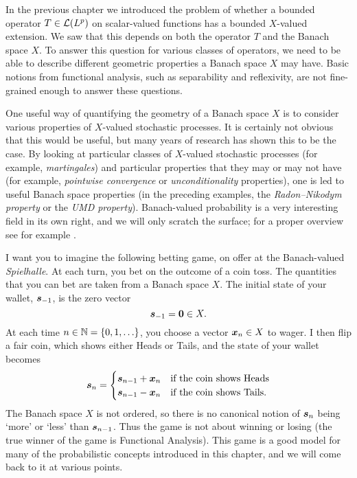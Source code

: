 In the previous chapter we introduced the problem of whether a bounded operator $T \in \mathcal{L}(L^p)$ on scalar-valued functions has a bounded $X$-valued extension.
We saw that this depends on both the operator $T$ and the Banach space $X$.
To answer this question for various classes of operators, we need to be able to describe different geometric properties a Banach space $X$ may have.
Basic notions from functional analysis, such as separability and reflexivity, are not fine-grained enough to answer these questions.

One useful way of quantifying the geometry of a Banach space $X$ is to consider various properties of $X$-valued stochastic processes.
It is certainly not obvious that this would be useful, but many years of research has shown this to be the case.
By looking at particular classes of $X$-valued stochastic processes (for example, \emph{martingales}) and particular properties that they may or may not have (for example, \emph{pointwise convergence} or \emph{unconditionality} properties), one is led to useful Banach space properties (in the preceding examples, the \emph{Radon--Nikodym property} or the \emph{UMD property}).
Banach-valued probability is a very interesting field in its own right, and we will only scratch the surface; for a proper overview see for example \cite{LT91}.

I want you to imagine the following betting game, on offer at the Banach-valued \emph{Spielhalle}.
At each turn, you bet on the outcome of a coin toss.
The quantities that you can bet are taken from a Banach space $X$.
The initial state of your wallet, $\bm{s}_{-1}$, is the zero vector
\begin{equation*}
  \bm{s}_{-1} = \bm{0} \in X.
\end{equation*}
At each time $n \in \mathbb{N} = \{0,1,\ldots\}$, you choose a vector $\bm{x}_n \in X$ to wager.
I then flip a fair coin, which shows either Heads or Tails, and the state of your wallet becomes
\begin{equation*}
  \bm{s}_n =
  \begin{cases}
    \bm{s}_{n-1} + \bm{x}_n & \text{if the coin shows Heads} \\
    \bm{s}_{n-1} - \bm{x}_n & \text{if the coin shows Tails.}
  \end{cases}
\end{equation*}
The Banach space $X$ is not ordered, so there is no canonical notion of $\bm{s}_n$ being `more' or `less' than $\bm{s}_{n-1}$. Thus the game is not about winning or losing (the true winner of the game is Functional Analysis).
This game is a good model for many of the probabilistic concepts introduced in this chapter, and we will come back to it at various points.

